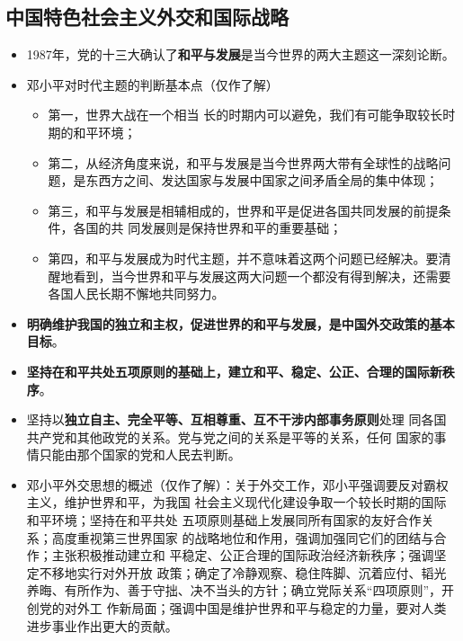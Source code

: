 \documentclass[12pt,openany]{ctexbook}
\begin{document}
\subsection{中国特色社会主义外交和国际战略}
\begin{itemize}
  \item 1987年，党的十三大确认了\textbf{和平与发展}是当今世界的两大主题这一深刻论断。
  \item 邓小平对时代主题的判断基本点（仅作了解）
\begin{itemize}
  \item 第一，世界大战在一个相当 长的时期内可以避免，我们有可能争取较长时期的和平环境；
  \item 第二，从经济角度来说，和平与发展是当今世界两大带有全球性的战略问题，是东西方之间、发达国家与发展中国家之间矛盾全局的集中体现；
  \item 第三，和平与发展是相辅相成的，世界和平是促进各国共同发展的前提条件，各国的共 同发展则是保持世界和平的重要基础；
  \item 第四，和平与发展成为时代主题，并不意味着这两个问题已经解决。要清醒地看到，当今世界和平与发展这两大问题一个都没有得到解决，还需要各国人民长期不懈地共同努力。
\end{itemize}
  \item \textbf{明确维护我国的独立和主权，促进世界的和平与发展，是中国外交政策的基本目标}。
  \item \textbf{坚持在和平共处五项原则的基础上，建立和平、稳定、公正、合理的国际新秩序}。
  \item 坚持以\textbf{独立自主、完全平等、互相尊重、互不干涉内部事务原则}处理 同各国共产党和其他政党的关系。党与党之间的关系是平等的关系，任何 国家的事情只能由那个国家的党和人民去判断。
  \item 邓小平外交思想的概述（仅作了解）：关于外交工作，邓小平强调要反对霸权主义，维护世界和平，为我国 社会主义现代化建设争取一个较长时期的国际和平环境；坚持在和平共处 五项原则基础上发展同所有国家的友好合作关系；高度重视第三世界国家 的战略地位和作用，强调加强同它们的团结与合作；主张积极推动建立和 平稳定、公正合理的国际政治经济新秩序；强调坚定不移地实行对外开放 政策；确定了冷静观察、稳住阵脚、沉着应付、韬光养晦、有所作为、善于守拙、决不当头的方针；确立党际关系“四项原则”，开创党的对外工 作新局面；强调中国是维护世界和平与稳定的力量，要对人类进步事业作出更大的贡献。
\end{itemize}
\end{document}
